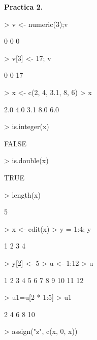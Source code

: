 \documentclass{article}
\begin{document}


\textbf{Practica 2.}



\begin{Schunk}
\begin{Sinput}
> v <- numeric(3);v
\end{Sinput}
\begin{Soutput}
[1] 0 0 0
\end{Soutput}
\begin{Sinput}
> v[3] <- 17; v
\end{Sinput}
\begin{Soutput}
[1]  0  0 17
\end{Soutput}
\begin{Sinput}
> x <- c(2, 4, 3.1, 8, 6)
> x
\end{Sinput}
\begin{Soutput}
[1] 2.0 4.0 3.1 8.0 6.0
\end{Soutput}
\begin{Sinput}
> is.integer(x) 
\end{Sinput}
\begin{Soutput}
[1] FALSE
\end{Soutput}
\begin{Sinput}
> is.double(x)
\end{Sinput}
\begin{Soutput}
[1] TRUE
\end{Soutput}
\begin{Sinput}
> length(x)
\end{Sinput}
\begin{Soutput}
[1] 5
\end{Soutput}
\begin{Sinput}
> x <- edit(x)
> y = 1:4; y
\end{Sinput}
\begin{Soutput}
[1] 1 2 3 4
\end{Soutput}
\begin{Sinput}
> y[2] <- 5
> u <- 1:12
> u
\end{Sinput}
\begin{Soutput}
 [1]  1  2  3  4  5  6  7  8  9 10 11 12
\end{Soutput}
\begin{Sinput}
> u1=u[2 * 1:5]
> u1
\end{Sinput}
\begin{Soutput}
[1]  2  4  6  8 10
\end{Soutput}
\begin{Sinput}
> assign("z", c(x, 0, x))

\end{Sinput}
\end{Schunk}
\end{document}
